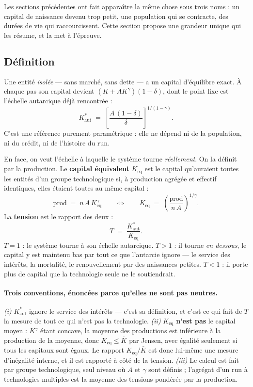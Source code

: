 \documentclass[11pt,a4paper]{article}
\newcommand{\Kaut}{K^{*}_{\mathrm{aut}}}
\begin{document}
Les sections précédentes ont fait apparaître la même chose sous trois noms :
un capital de naissance devenu trop petit, une population qui se contracte,
des durées de vie qui raccourcissent. Cette section propose une grandeur
unique qui les résume, et la met à l'épreuve.

\subsection{Définition}

Une entité \emph{isolée} --- sans marché, sans dette --- a un capital
d'équilibre exact. À chaque pas son capital devient
$(K + A K^{\gamma})(1-\delta)$, dont le point fixe est l'échelle autarcique
déjà rencontrée :
\begin{equation}
\Kaut \;=\; \left[\frac{A\,(1-\delta)}{\delta}\right]^{1/(1-\gamma)} .
\label{eq:kaut}
\end{equation}
C'est une référence purement paramétrique : elle ne dépend ni de la
population, ni du crédit, ni de l'histoire du run.

En face, on veut l'échelle à laquelle le système tourne \emph{réellement}.
On la définit par la production. Le \textbf{capital équivalent} $K_{\text{eq}}$
est le capital qu'auraient toutes les entités d'un groupe technologique si,
à production agrégée et effectif identiques, elles étaient toutes au même
capital :
\begin{equation}
\mathrm{prod} \;=\; n\,A\,K_{\text{eq}}^{\gamma}
\qquad\Longleftrightarrow\qquad
K_{\text{eq}} \;=\; \left(\frac{\mathrm{prod}}{n\,A}\right)^{1/\gamma} .
\label{eq:keq}
\end{equation}
La \textbf{tension} est le rapport des deux :
\begin{equation}
T \;=\; \frac{\Kaut}{K_{\text{eq}}} .
\label{eq:tension}
\end{equation}
$T = 1$ : le système tourne à son échelle autarcique. $T > 1$ : il tourne
\emph{en dessous}, le capital y est maintenu bas par tout ce que l'autarcie
ignore --- le service des intérêts, la mortalité, le renouvellement par des
naissances petites. $T < 1$ : il porte plus de capital que la technologie
seule ne le soutiendrait.

\paragraph{Trois conventions, énoncées parce qu'elles ne sont pas neutres.}
\emph{(i)} $\Kaut$ ignore le service des intérêts --- c'est sa définition,
et c'est ce qui fait de $T$ la mesure de tout ce qui n'est pas la
technologie. \emph{(ii)} $K_{\text{eq}}$ \textbf{n'est pas} le capital
moyen : $K^{\gamma}$ étant concave, la moyenne des productions est
inférieure à la production de la moyenne, donc
$K_{\text{eq}} \le \overline{K}$ par Jensen, avec égalité seulement si tous
les capitaux sont égaux. Le rapport $K_{\text{eq}}/\overline{K}$ est donc
lui-même une mesure d'inégalité interne, et il est rapporté à côté de la
tension. \emph{(iii)} Le calcul est fait par groupe technologique, seul
niveau où $A$ et $\gamma$ sont définis ; l'agrégat d'un run à technologies
multiples est la moyenne des tensions pondérée par la production.
\end{document}

